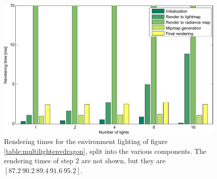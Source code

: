 \begin{figure}[!ht]
\centering
  \includegraphics[width=0.7\linewidth]{images/matlab/multiple_lights_test.pdf}

\caption{Rendering times for the environment lighting of figure \ref{table:multilightenvdragon}, split into the various components. The rendering times of step 2 are not shown, but they are $[87.2\ 90.2\ 89.4\ 91.6\ 95.2]$.}
\label{fig:numblights}
\end{figure}
